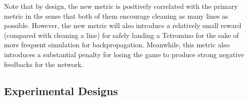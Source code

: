 \documentclass[letterpaper]{article} %
\begin{document}
Note that by design, the new metric is positively correlated with the primary metric in the sense that both of them encourage cleaning as many lines as possible. However, the new metric will also introduce a relatively small reward (compared with cleaning a line) for safely landing a Tetromino for the sake of more frequent simulation for backpropagation. Meanwhile, this metric also introduces a substantial penalty for losing the game to produce strong negative feedbacks for the network.

\subsection{Experimental Designs}
\end{document}
